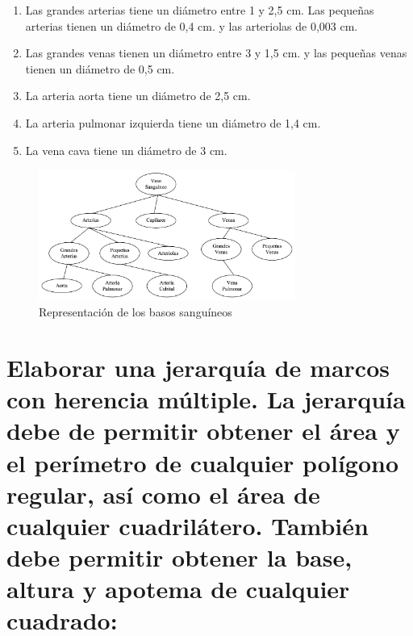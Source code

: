 \documentclass[10pt, a4paper,spanish]{article}
\begin{document}
\begin{enumerate}[label=\alph*)]
      \item Las grandes arterias tiene un diámetro entre 1 y 2,5 cm. Las pequeñas arterias tienen un diámetro de 0,4 cm. y las arteriolas de 0,003 cm.

      \item Las grandes venas tienen un diámetro entre 3 y 1,5 cm. y las pequeñas venas tienen un diámetro de 0,5 cm.

      \item La arteria aorta tiene un diámetro de 2,5 cm.

      \item La arteria pulmonar izquierda tiene un diámetro de 1,4 cm.

      \item La vena cava tiene un diámetro de 3 cm.

    \end{enumerate}


		\begin{figure}[htpb!]
			\begin{center}
				\includegraphics[width=0.75\textwidth]{diagram}
				\caption{Representación de los basos sanguíneos}
				\label{image:blood-vessel}
			\end{center}
		\end{figure}


		\paragraph{}



	\section{Elaborar una jerarquía de marcos con herencia múltiple. La jerarquía debe de permitir obtener el área y el perímetro de cualquier polígono regular, así como el área de cualquier cuadrilátero. También debe permitir obtener la base, altura y apotema de cualquier cuadrado:}
\end{document}
